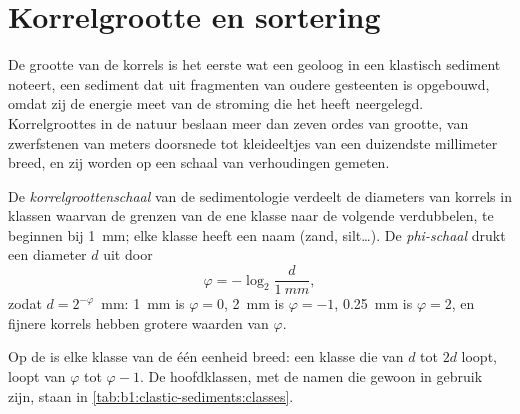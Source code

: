 \section{Korrelgrootte en sortering}\label{sec:b1:clastic-sediments:grain-size}

De grootte van de korrels is het eerste wat een geoloog in een klastisch sediment noteert, een sediment dat uit fragmenten van oudere gesteenten is opgebouwd, omdat zij de energie meet van de stroming die het heeft neergelegd. Korrelgroottes in de natuur beslaan meer dan zeven ordes van grootte, van zwerfstenen van meters doorsnede tot kleideeltjes van een duizendste millimeter breed, en zij worden op een schaal van verhoudingen gemeten.

\begin{definition}\label{def:b1:clastic-sediments:grain-size}
De \emph{korrelgroottenschaal} van de sedimentologie verdeelt de diameters van korrels in klassen waarvan de grenzen van de ene klasse naar de volgende verdubbelen, te beginnen bij \qty{1}{mm}; elke klasse heeft een naam (zand, silt\ldots). De \emph{phi-schaal} drukt een diameter $d$ uit door
\[
  \varphi = -\log_2 \frac{d}{\qty{1}{mm}},
\]
zodat $d = 2^{-\varphi}$~mm: \qty{1}{mm} is $\varphi = 0$, \qty{2}{mm} is $\varphi = -1$, \qty{0.25}{mm} is $\varphi = 2$, en fijnere korrels hebben grotere waarden van $\varphi$.
\end{definition}

Op de  is elke klasse van de  één eenheid breed: een klasse die van $d$ tot $2d$ loopt, loopt van $\varphi$ tot $\varphi - 1$. De hoofdklassen, met de namen die gewoon in gebruik zijn, staan in \cref{tab:b1:clastic-sediments:classes}.

